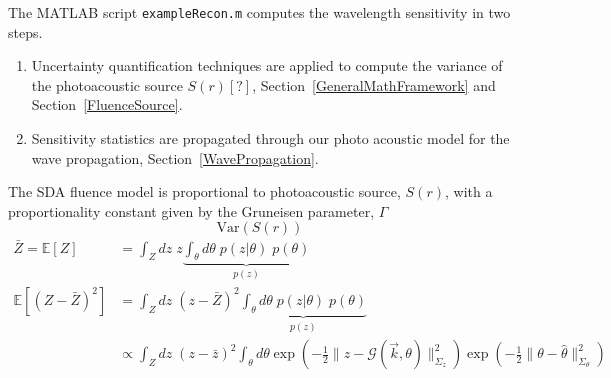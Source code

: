 \documentclass{article}         %
\theoremstyle{definition}
\theoremstyle{remark}
\begin{document}
The MATLAB script \texttt{exampleRecon.m} computes the wavelength
sensitivity in two steps.
\begin{enumerate}
\item
Uncertainty quantification techniques are applied to compute the variance
of the photoacoustic source $S(r)[?]$, 
Section~\ref{GeneralMathFramework} and Section~\ref{FluenceSource}.
\item  Sensitivity statistics are propagated through our photo acoustic
model for the wave propagation, Section~\ref{WavePropagation}.
\end{enumerate}
The SDA fluence model is  proportional to 
photoacoustic source, $S(r)$,
with a proportionality constant given by the
Gruneisen parameter, $\Gamma$ \\
\[
   \text{Var}(S(r))
\]
\[ \begin{split}
   \bar{Z} = \mathbb{E}[Z]  & = \int_Z   dz \; z
   \underbrace{\int_\theta  d\theta \; p(z|\theta) \; p(\theta)}_{p(z)}
  \\
   \mathbb{E}[ ( Z - \bar{Z} )^2 ]  & = \int_Z   dz \;(z - \bar{Z})^2 
   \underbrace{\int_\theta  d\theta \; p(z|\theta) \; p(\theta)}_{p(z)}
  \\
   &  \propto
    \int_Z   dz \;(z - \bar{z})^2 \int_\theta  d\theta 
 \exp\left( - \frac{1}{2} \|  z- \mathcal{G}(\vec{k},\theta)  \|^2_{\Sigma_z}\right)
 \exp\left( - \frac{1}{2} \|  \theta - \hat{\theta}  \|^2_{\Sigma_\theta}\right)
 \end{split}
\]
\end{document}
